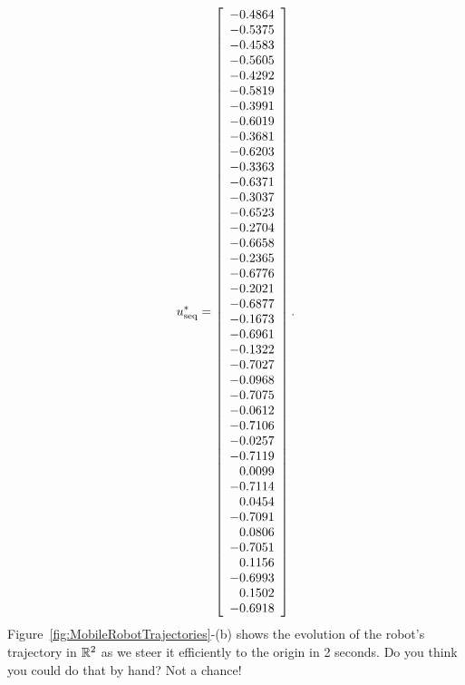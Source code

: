 \begin{equation}
\label{eq:uMobileRobotLong}
 u_{\rm seq}^\ast = \left[
\begin{array}{r}
-0.4864 \\
-0.5375 \\
-0.4583 \\
-0.5605 \\
-0.4292 \\
-0.5819 \\
-0.3991 \\
-0.6019 \\
-0.3681 \\
-0.6203 \\
-0.3363 \\
-0.6371 \\
-0.3037 \\
-0.6523 \\
-0.2704 \\
-0.6658 \\
-0.2365 \\
-0.6776 \\
-0.2021 \\
-0.6877 \\
-0.1673 \\
-0.6961 \\
-0.1322 \\
-0.7027 \\
-0.0968 \\
-0.7075 \\
-0.0612 \\
-0.7106 \\
-0.0257 \\
-0.7119 \\
0.0099 \\
-0.7114 \\
0.0454 \\
-0.7091 \\
0.0806 \\
-0.7051 \\
0.1156 \\
-0.6993 \\
0.1502 \\
-0.6918 \\
\end{array}
\right].
\end{equation}
Figure~\ref{fig:MobileRobotTrajectories}-(b) shows the evolution of the robot's trajectory in $\mathbb R^2$ as we steer it efficiently to the origin in 2 seconds. Do you think you could do that by hand? Not a chance! \\

